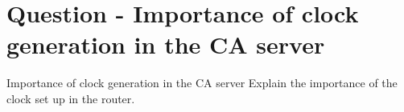\section{Question - Importance of clock generation in the CA server}

\begin{questionBox}{Importance of clock generation in the CA server}
    Explain the importance of the clock set up in the router.
\end{questionBox}
